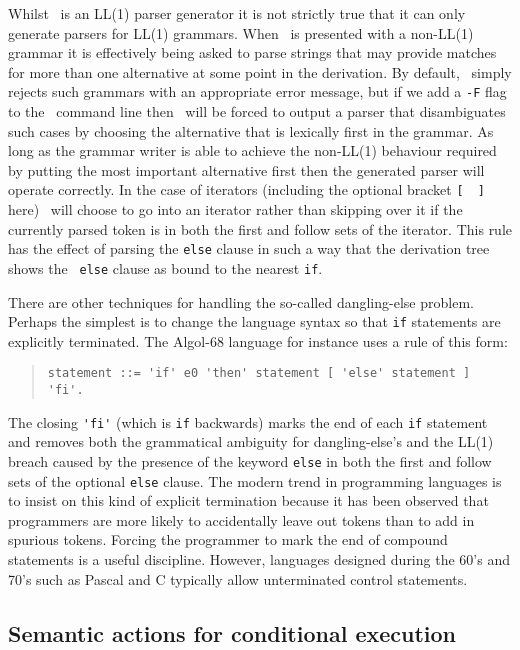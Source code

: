 Whilst \rdp\ is an LL(1) parser generator it is not strictly true that
it can only generate parsers for LL(1) grammars. When \rdp\ is presented
with a non-LL(1) grammar it is effectively being asked to parse
strings that may provide matches for more than one alternative at some
point in the derivation. By default, \rdp\ simply rejects such grammars
with an appropriate error message, but if we add a {\tt -F} flag to the
\rdp\ command line then \rdp\ will be forced to output a parser that
disambiguates such cases by choosing the alternative that is lexically
first in the grammar. As long as the grammar writer is able to achieve
the non-LL(1) behaviour required by putting the most important
alternative first then the generated parser will operate correctly. In
the case of iterators (including the optional bracket \verb+[  ]+ here)
\rdp\ will choose to go into an  iterator rather than skipping over it
if the currently parsed token is in both the {\sc first} and {\sc
follow} sets of the iterator. This rule has the effect of parsing the
{\tt else} clause in such a way that the derivation tree shows the {\tt
else} clause as bound to the nearest {\tt if}.

There are other techniques for handling the so-called dangling-else
problem. Perhaps the simplest is to change the language syntax so that
{\tt if} statements are explicitly terminated. The Algol-68 language for 
instance uses a rule of this form:
\begin{quote}
\small
\begin{verbatim}
statement ::= 'if' e0 'then' statement [ 'else' statement ] 'fi'.
\end{verbatim}
\end{quote}

The closing \verb+'fi'+ (which is {\tt if} backwards) marks the end of
each {\tt if} statement and removes both the grammatical ambiguity for
dangling-else's and the LL(1) breach caused by the presence of the
keyword  {\tt else} in both the {\sc first} and {\sc follow} sets of the
optional {\tt else} clause. The modern trend in programming languages is
to insist on this kind of explicit termination because it has been
observed that programmers are more likely to accidentally leave out
tokens than to add in spurious tokens. Forcing the programmer to mark the
end of compound statements is a useful discipline. However, languages 
designed during the 60's and 70's such as Pascal and C typically allow
unterminated control statements.

\subsection{Semantic actions for conditional execution}

